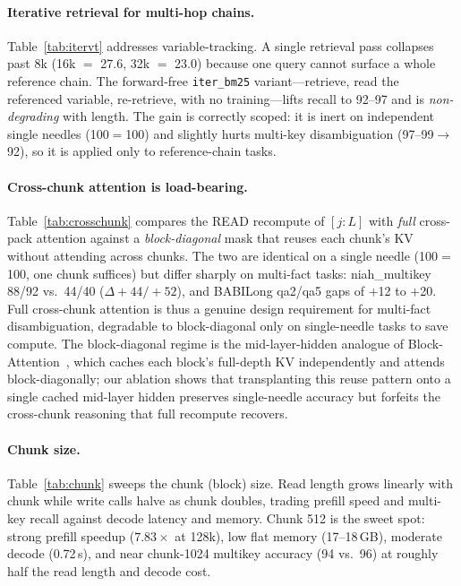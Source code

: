 

\paragraph{Iterative retrieval for multi-hop chains.}
Table~\ref{tab:itervt} addresses variable-tracking. A single retrieval pass
collapses past 8k (16k $=$ 27.6, 32k $=$ 23.0) because one query cannot surface a
whole reference chain. The forward-free \texttt{iter\_bm25} variant---retrieve,
read the referenced variable, re-retrieve, with no training---lifts recall to
92--97 and is \emph{non-degrading} with length. The gain is correctly scoped: it
is inert on independent single needles (100$=$100) and slightly hurts multi-key
disambiguation (97--99$\to$92), so it is applied only to reference-chain tasks.



\paragraph{Cross-chunk attention is load-bearing.}
Table~\ref{tab:crosschunk} compares the READ recompute of $[j{:}L]$ with
\emph{full} cross-pack attention against a \emph{block-diagonal} mask that reuses
each chunk's KV without attending across chunks. The two are identical on a
single needle (100$=$100, one chunk suffices) but differ sharply on multi-fact
tasks: niah\_multikey 88/92 vs.\ 44/40 ($\Delta{+}44/{+}52$), and BABILong
qa2/qa5 gaps of $+$12 to $+$20. Full cross-chunk attention is thus a genuine
design requirement for multi-fact disambiguation, degradable to block-diagonal
only on single-needle tasks to save compute. The block-diagonal regime is the
mid-layer-hidden analogue of Block-Attention~\citep{blockattn}, which caches each
block's full-depth KV independently and attends block-diagonally; our ablation
shows that transplanting this reuse pattern onto a single cached mid-layer hidden
preserves single-needle accuracy but forfeits the cross-chunk reasoning that full
recompute recovers.



\paragraph{Chunk size.}
Table~\ref{tab:chunk} sweeps the chunk (block) size. Read length grows linearly
with chunk while write calls halve as chunk doubles, trading prefill speed and
multi-key recall against decode latency and memory. Chunk 512 is the sweet spot:
strong prefill speedup ($7.83\times$ at 128k), low flat memory (17--18\,GB),
moderate decode (0.72\,s), and near chunk-1024 multikey accuracy (94 vs.\ 96) at
roughly half the read length and decode cost.

